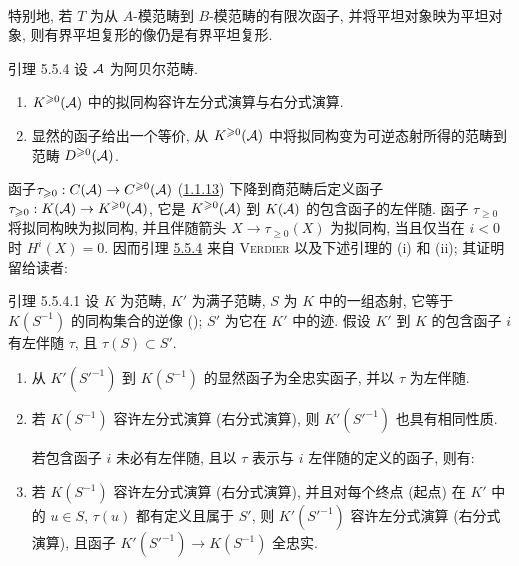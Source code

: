 \paragraph{}
特别地, 若 $T$ 为从 $A$-模范畴到 $B$-模范畴的有限次函子, 并将平坦对象映为平坦对象, 则有界平坦复形的像仍是有界平坦复形.

\begin{enonce*}{引理 5.5.4}
设 ${\mathcal A}$ 为阿贝尔范畴.
\begin{enumerate}
\renewcommand{\theenumi}{\roman{enumi}}
\renewcommand{\labelenumi}{(\theenumi)}
\item $K^{\geqslant 0}({\mathcal A})$ 中的拟同构容许左分式演算与右分式演算.

\item 显然的函子给出一个等价, 从 $K^{\geqslant 0}({\mathcal A})$ 中将拟同构变为可逆态射所得的范畴到范畴 $D^{\geqslant 0}({\mathcal A})$.
\end{enumerate}
\end{enonce*}

函子\pageoriginale $\tau_{\geqslant 0}:C({\mathcal A})\rightarrow
C^{\geqslant 0}({\mathcal A})$ (\hyperref[XVII.def1.1.13]{1.1.13}) 下降到商范畴后定义函子 $\tau_{\geqslant 0}:K({\mathcal A})\rightarrow K^{\geqslant
0}({\mathcal A})$, 它是 $K^{\geqslant
0}({\mathcal A})$ 到 $K({\mathcal A})$ 的包含函子的左伴随. 函子 $\tau_{\geq 0}$ 将拟同构映为拟同构, 并且伴随箭头 $X\rightarrow \tau_{\geq 0}(X)$ 为拟同构, 当且仅当在 $i<0$ 时 $H^{i}(X)=0$. 因而引理 \hyperref[XVII.lem5.5.4]{5.5.4} 来自 \textsc{Verdier} \cite{sga4.exp.XVII.bib.CD} 以及下述引理的 (i) 和 (ii); 其证明留给读者:

\begin{enonce*}{引理 5.5.4.1}
设 $K$ 为范畴, $K'$ 为满子范畴, $S$ 为 $K$ 中的一组态射, 它等于 $K(S^{-1})$ 的同构集合的逆像 (\cf \cite[]{sga4.exp.XVII.bib.GZ}); $S'$ 为它在 $K'$ 中的迹. 假设 $K'$ 到 $K$ 的包含函子 $i$ 有左伴随 $\tau$, 且 $\tau(S)\subset S'$.
\begin{enumerate}
\renewcommand{\theenumi}{\roman{enumi}}
\renewcommand{\labelenumi}{(\theenumi)}
\item 从 $K'({S'}^{-1})$ 到 $K(S^{-1})$ 的显然函子为全忠实函子, 并以 $\tau$ 为左伴随.

\item 若 $K(S^{-1})$ 容许左分式演算 (\resp 右分式演算), 则 $K'({S'}^{-1})$ 也具有相同性质.

若包含函子 $i$ 未必有左伴随, 且以 $\tau$ 表示与 $i$ 左伴随的定义的函子, 则有:

\item 若 $K(S^{-1})$ 容许左分式演算 (\resp 右分式演算), 并且对每个终点 (\resp 起点) 在 $K'$ 中的 $u\in S$, $\tau(u)$ 都有定义且属于 $S'$, 则 $K'({S'}^{-1})$ 容许左分式演算 (\resp 右分式演算), 且函子 $K'({S'}^{-1})\rightarrow K(S^{-1})$ 全忠实.
\end{enumerate}
\end{enonce*}


